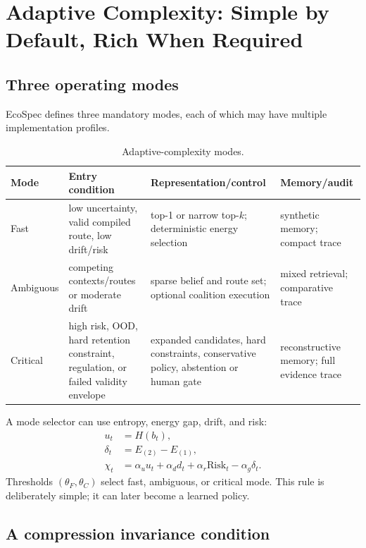 \documentclass[10pt]{article}
\begin{document}
\section{Adaptive Complexity: Simple by Default, Rich When Required}

\subsection{Three operating modes}

EcoSpec defines three mandatory modes, each of which may have multiple implementation profiles.

\begin{table}[h]
\centering
\caption{Adaptive-complexity modes.}
\label{tab:modes}
\begin{tabularx}{\textwidth}{lXXX}
\toprule
Mode & Entry condition & Representation/control & Memory/audit \\
\midrule
Fast & low uncertainty, valid compiled route, low drift/risk & top-1 or narrow top-$k$; deterministic energy selection & synthetic memory; compact trace \\
Ambiguous & competing contexts/routes or moderate drift & sparse belief and route set; optional coalition execution & mixed retrieval; comparative trace \\
Critical & high risk, OOD, hard retention constraint, regulation, or failed validity envelope & expanded candidates, hard constraints, conservative policy, abstention or human gate & reconstructive memory; full evidence trace \\
\bottomrule
\end{tabularx}
\end{table}

A mode selector can use entropy, energy gap, drift, and risk:
\begin{align}
  u_t &= H(b_t),\\
  \delta_t &= E_{(2)}-E_{(1)},\\
  \chi_t &= \alpha_u u_t + \alpha_d d_t + \alpha_r \mathrm{Risk}_t - \alpha_g\delta_t.
  \label{eq:complexityscore}
\end{align}
Thresholds $(\theta_F,\theta_C)$ select fast, ambiguous, or critical mode. This rule is deliberately simple; it can later become a learned policy.

\subsection{A compression invariance condition}
\end{document}
